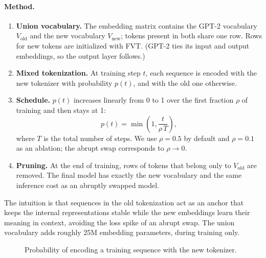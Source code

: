 \documentclass[11pt,a4paper]{article}
\begin{document}
\paragraph{Method.}
\begin{enumerate}
  \item \textbf{Union vocabulary.} The embedding matrix contains the GPT-2 vocabulary $V_{\text{old}}$ and the new vocabulary $V_{\text{new}}$; tokens present in both share one row. Rows for new tokens are initialized with FVT. (GPT-2 ties its input and output embeddings, so the output layer follows.)
  \item \textbf{Mixed tokenization.} At training step $t$, each sequence is encoded with the new tokenizer with probability $p(t)$, and with the old one otherwise.
  \item \textbf{Schedule.} $p(t)$ increases linearly from 0 to 1 over the first fraction $\rho$ of training and then stays at 1:
  \begin{equation}
    p(t) = \min\!\left(1, \frac{t}{\rho\, T}\right),
  \end{equation}
  where $T$ is the total number of steps. We use $\rho = 0.5$ by default and $\rho = 0.1$ as an ablation; the abrupt swap corresponds to $\rho \to 0$.
  \item \textbf{Pruning.} At the end of training, rows of tokens that belong only to $V_{\text{old}}$ are removed. The final model has exactly the new vocabulary and the same inference cost as an abruptly swapped model.
\end{enumerate}
The intuition is that sequences in the old tokenization act as an anchor that keeps the internal representations stable while the new embeddings learn their meaning in context, avoiding the loss spike of an abrupt swap. The union vocabulary adds roughly 25M embedding parameters, during training only.

\begin{figure}[h]
\centering
{}
\caption{Probability of encoding a training sequence with the new tokenizer.}
\label{fig:schedule}
\end{figure}
\end{document}
